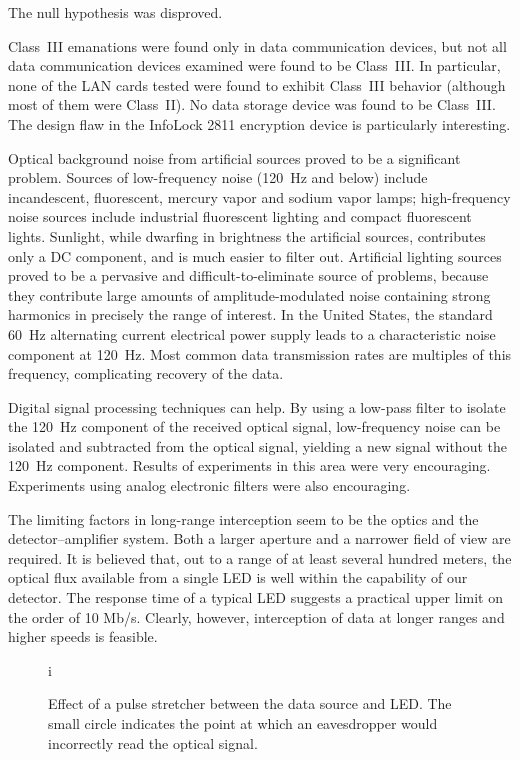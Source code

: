 \documentclass{acmtrans2e}
\begin{document}
The null hypothesis was disproved.

Class~III emanations were found only in data communication devices, but 
not all data communication devices examined were found to be Class~III.  In particular,
none of the LAN cards tested were found to exhibit Class~III behavior 
(although most of them were Class~II).  No data storage device was found 
to be Class~III.  The design flaw in the InfoLock 2811 encryption device 
is particularly interesting.

Optical background noise from artificial sources proved to be a 
significant problem.  Sources of low-frequency noise (120~Hz and below) 
include incandescent, fluorescent, mercury vapor and sodium vapor lamps; 
high-frequency noise sources include industrial fluorescent lighting and 
compact fluorescent lights.  Sunlight, while dwarfing in brightness the 
artificial sources, contributes only a DC component, and is 
much easier to filter out.  Artificial lighting sources proved to be a 
pervasive and difficult-to-eliminate source of problems,
because they contribute large amounts of amplitude-modulated noise 
containing strong harmonics in precisely the range of interest.  In the 
United States, the standard 60~Hz alternating current electrical 
power supply leads to a characteristic noise component at 120~Hz.  Most 
common data transmission rates are multiples of this frequency, 
complicating recovery of the data.

Digital signal processing techniques can help.  By using a low-pass 
filter to isolate the 120~Hz component of the received optical signal, 
low-frequency noise can be isolated and subtracted from the optical 
signal, yielding a new signal without the 120~Hz component.  Results of 
experiments in this area were very encouraging.   Experiments using 
analog electronic filters were also encouraging.

The limiting factors in long-range interception seem to be the optics 
and the detector--amplifier system.  Both a larger aperture and a narrower 
field of view are required.  It is believed that, out to a range of 
at least several hundred meters, the optical flux available from a
single LED is well within the capability of our detector.  The response
time of a typical LED suggests a practical upper limit on the order of
10 Mb/s.  Clearly, however, interception of data at longer ranges and
higher speeds is feasible.

\begin{figure}
\centering
i%
\caption{Effect of a pulse stretcher between the data source and LED.  
The small circle indicates the point at which an eavesdropper would 
incorrectly read the optical signal.}
\label{pulse_stretcher_figure}
\end{figure}
\end{document}
